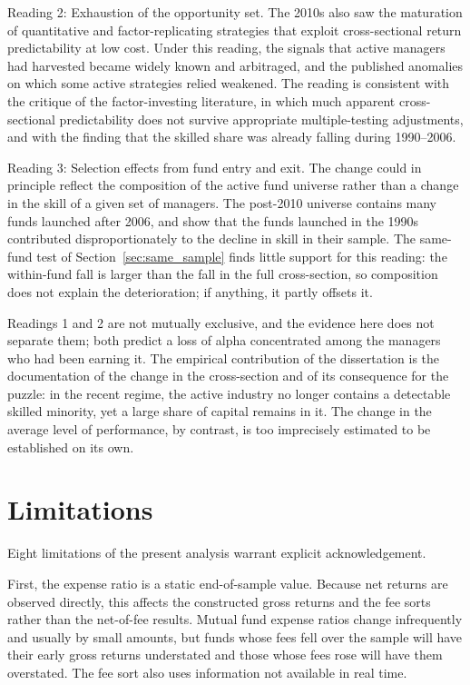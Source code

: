 \documentclass[12pt, oneside]{report}
\begin{document}
Reading 2: Exhaustion of the opportunity set. The 2010s also saw the
maturation of quantitative and factor-replicating strategies that
exploit cross-sectional return predictability at low cost. Under this
reading, the signals that active managers had harvested became widely
known and arbitraged, and the published anomalies on which some active
strategies relied weakened. The reading is consistent with the
\textcite{HarveyLiuZhu2016} critique of the factor-investing literature,
in which much apparent cross-sectional predictability does not survive
appropriate multiple-testing adjustments, and with the
\textcite{BarrasScailletWermers2010} finding that the skilled share was
already falling during 1990--2006.

Reading 3: Selection effects from fund entry and exit. The change could
in principle reflect the composition of the active fund universe rather
than a change in the skill of a given set of managers. The post-2010
universe contains many funds launched after 2006, and
\textcite{BarrasScailletWermers2010} show that the funds launched in the
1990s contributed disproportionately to the decline in skill in their
sample. The same-fund test of Section~\ref{sec:same_sample} finds little
support for this reading: the within-fund fall is larger than the fall
in the full cross-section, so composition does not explain the
deterioration; if anything, it partly offsets it.

Readings 1 and 2 are not mutually exclusive, and the evidence here does
not separate them; both predict a loss of alpha concentrated among the
managers who had been earning it. The empirical contribution of the
dissertation is the documentation of the change in the cross-section and
of its consequence for the puzzle: in the recent regime, the active
industry no longer contains a detectable skilled minority, yet a large
share of capital remains in it. The change in the average level of
performance, by contrast, is too imprecisely estimated to be established
on its own.

\section{Limitations}
\label{sec:limitations}

\noindent Eight limitations of the present analysis warrant explicit
acknowledgement.

First, the expense ratio is a static end-of-sample value. Because net
returns are observed directly, this affects the constructed gross returns
and the fee sorts rather than the net-of-fee results. Mutual fund expense
ratios change infrequently and usually by small amounts, but funds whose
fees fell over the sample will have their early gross returns understated
and those whose fees rose will have them overstated. The fee sort also
uses information not available in real time.
\end{document}
